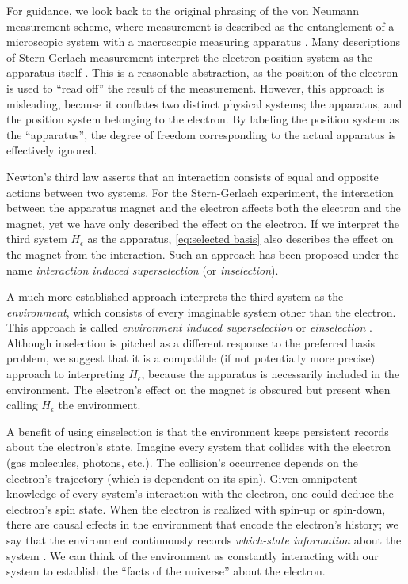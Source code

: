 For guidance, we look back to the original phrasing of the von Neumann measurement scheme, where measurement is described as the entanglement of a microscopic system with a macroscopic measuring apparatus \cite{Neumann}. Many descriptions of Stern-Gerlach measurement interpret the electron position system as the apparatus itself \cite{Venugopalan}. This is a reasonable abstraction, as the position of the electron is used to ``read off'' the result of the measurement. However, this approach is misleading, because it conflates two distinct physical systems; the apparatus, and the position system belonging to the electron. By labeling the position system as the ``apparatus'', the degree of freedom corresponding to the actual apparatus is effectively ignored.

Newton's third law asserts that an interaction consists of equal and opposite actions between two systems. For the Stern-Gerlach experiment, the interaction between the apparatus magnet and the electron affects both the electron and the magnet, yet we have only described the effect on the electron. If we interpret the third system $H_\epsilon$ as the apparatus, \autoref{eq:selected basis} also describes the effect on the magnet from the interaction. Such an approach has been proposed under the name \textit{interaction induced superselection} (or \textit{inselection})\cite{Wang}.

A much more established approach interprets the third system as the \textit{environment}, which consists of every imaginable system other than the electron. This approach is called \textit{environment induced superselection} or \textit{einselection} \cite{Zurek}. Although inselection is pitched as a different response to the preferred basis problem, we suggest that it is a compatible (if not potentially more precise) approach to interpreting $H_\epsilon$, because the apparatus is necessarily included in the environment. The electron's effect on the magnet is obscured but present when calling $H_\epsilon$ the environment.

A benefit of using einselection is that the environment keeps persistent records about the electron's state. Imagine every system that collides with the electron (gas molecules, photons, etc.). The collision's occurrence depends on the electron's trajectory (which is dependent on its spin). Given omnipotent knowledge of every system's interaction with the electron, one could deduce the electron's spin state. When the electron is realized with spin-up or spin-down, there are causal effects in the environment that encode the electron's history; we say that the environment continuously records \textit{which-state information} about the system \cite{Schlosshauer}. We can think of the environment as constantly interacting with our system to establish the ``facts of the universe'' about the electron.

